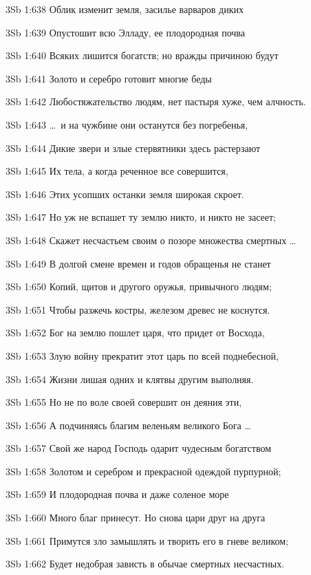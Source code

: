 \vs 3Sb 1:638 Облик изменит земля, засилье варваров диких 

\vs 3Sb 1:639 Опустошит всю Элладу, ее плодородная почва

\vs 3Sb 1:640 Всяких лишится богатств; но вражды причиною будут 

\vs 3Sb 1:641 Золото и серебро  готовит многие беды 

\vs 3Sb 1:642 Любостяжательство людям, нет пастыря хуже, чем алчность.

\vs 3Sb 1:643 \ldots\ и на чужбине они останутся без погребенья, 

\vs 3Sb 1:644 Дикие звери и злые стервятники здесь растерзают

\vs 3Sb 1:645 Их тела, а когда реченное все совершится, 

\vs 3Sb 1:646 Этих усопших останки земля широкая скроет. 

\vs 3Sb 1:647 Но уж не вспашет ту землю никто, и никто не засеет; 

\vs 3Sb 1:648 Скажет несчастьем своим о позоре множества смертных \ldots

\vs 3Sb 1:649 В долгой смене времен и годов обращенья не станет 

\vs 3Sb 1:650 Копий, щитов и другого оружья, привычного людям; 

\vs 3Sb 1:651 Чтобы разжечь костры, железом древес не коснутся.

\vs 3Sb 1:652 Бог на землю пошлет царя, что придет от Восхода, 

\vs 3Sb 1:653 Злую войну прекратит этот царь по всей поднебесной, 

\vs 3Sb 1:654 Жизни лишая одних и клятвы другим выполняя. 

\vs 3Sb 1:655 Но не по воле своей совершит он деяния эти, 

\vs 3Sb 1:656 А подчиняясь благим веленьям великого Бога \ldots\

\vs 3Sb 1:657 Свой же народ Господь одарит чудесным богатством  

\vs 3Sb 1:658 Золотом и серебром и прекрасной одеждой пурпурной; 

\vs 3Sb 1:659 И плодородная почва и даже соленое море

\vs 3Sb 1:660 Много благ принесут. Но снова цари друг на друга 

\vs 3Sb 1:661 Примутся зло замышлять и творить его в гневе великом; 

\vs 3Sb 1:662 Будет недобрая зависть в обычае смертных несчастных. 

